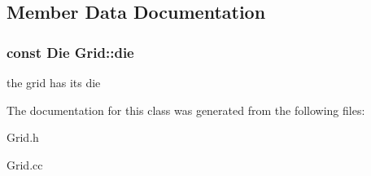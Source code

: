 \subsection{Member Data Documentation}
\hypertarget{classGrid_abd8ba23be391e599a69bd9892f4bc59a}{
\subsubsection[{die}]{\setlength{\rightskip}{0pt plus 5cm}const {\bf Die} {\bf Grid::die}}}
\label{classGrid_abd8ba23be391e599a69bd9892f4bc59a}
the grid has its die 

The documentation for this class was generated from the following files:\begin{DoxyCompactItemize}
\item 
Grid.h\item 
Grid.cc\end{DoxyCompactItemize}
